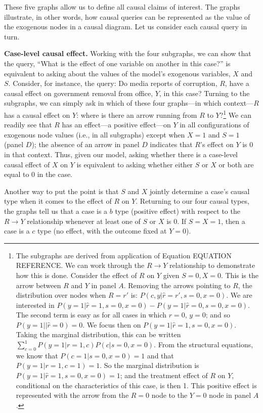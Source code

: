 \documentclass[12pt,]{book}
\let\rmarkdownfootnote\footnote%
\def\footnote{\protect\rmarkdownfootnote}
\begin{document}
These five graphs allow us to define all causal claims of interest. The graphs illustrate, in other words, how causal queries can be represented as the value of the exogenous nodes in a causal diagram. Let us consider each causal query in turn.

\textbf{Case-level causal effect.} Working with the four subgraphs, we can show that the query, ``What is the effect of one variable on another in this case?'' is equivalent to asking about the values of the model's exogenous variables, \(X\) and \(S\). Consider, for instance, the query: Do media reports of corruption, \(R\), have a causal effect on government removal from office, \(Y\), in this case? Turning to the subgraphs, we can simply ask in which of these four graphs---in which context---\(R\) has a causal effect on \(Y\): where is there an arrow running from \(R\) to \(Y\)?\footnote{The subgraphs are derived from application of Equation EQUATION REFERENCE. We can work through the \(R \rightarrow Y\) relationship to demonstrate how this is done. Consider the effect of \(R\) on \(Y\) given \(S=0, X=0\). This is the arrow between \(R\) and \(Y\) in panel \(A\). Removing the arrows pointing to \(R\), the distribution over nodes when \(R=r'\) is: \(P(c,y | \hat{r}=r', s =0, x=0)\). We are interested in \(P(y=1| \hat{r}=1, s =0, x=0) - P(y=1 | \hat{r}= 0, s =0, x=0)\). The second term is easy as for all cases in which \(r=0\), \(y=0\); and so \(P(y=1|| \hat{r}= 0)=0\). We focus then on \(P(y=1| \hat{r}=1, s= 0, x= 0)\). Taking the marginal distribution, this can be written \(\sum_{c=0}^1P(y=1|r=1, c)P(c|s=0,x=0)\). From the structural equations, we know that \(P(c=1|s=0,x=0)=1\) and that \(P(y=1|r=1, c=1)=1\). So the marginal distribution is \(P(y=1| \hat{r}=1, s= 0, x= 0) = 1\); and the treatment effect of \(R\) on \(Y\), conditional on the characteristics of this case, is then 1. This positive effect is represented with the arrow from the \(R=0\) node to the \(Y=0\) node in panel \(A\).} We can readily see that \(R\) has an effect---a positive effect---on \(Y\) in all configurations of exogenous node values (i.e., in all subgraphs) except when \(X=1\) and \(S=1\) (panel \(D\)); the absence of an arrow in panel \(D\) indicates that \(R\)'s effect on \(Y\) is 0 in that context. Thus, given our model, asking whether there is a case-level causal effect of \(X\) on \(Y\) is equivalent to asking whether either \(S\) or \(X\) or both are equal to \(0\) in the case.

Another way to put the point is that \(S\) and \(X\) jointly determine a case's causal type when it comes to the effect of \(R\) on \(Y\). Returning to our four causal types, the graphs tell us that a case is a \(b\) type (positive effect) with respect to the \(R \rightarrow Y\) relationship whenever at least one of \(S\) or \(X\) is \(0\). If \(S=X=1\), then a case is a \(c\) type (no effect, with the outcome fixed at \(Y=0\)).
\end{document}
